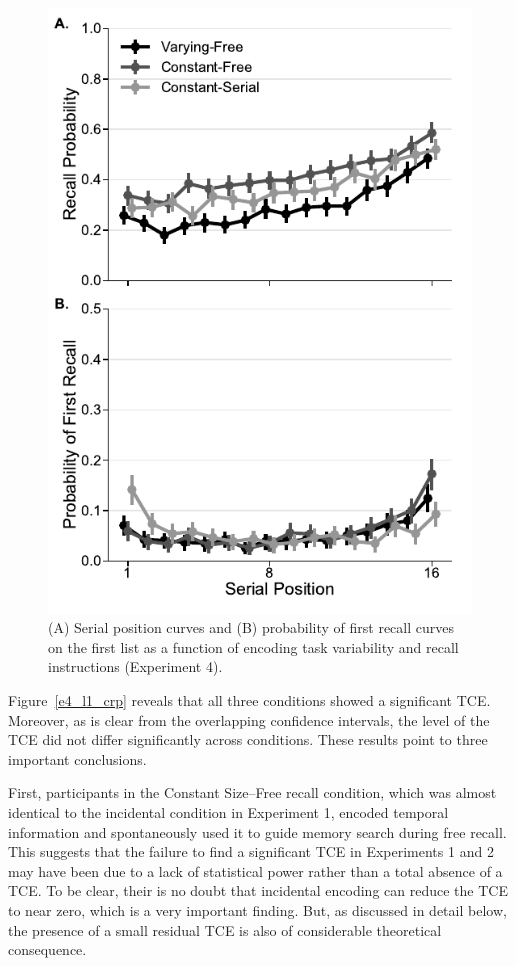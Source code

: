 \documentclass[man,natbib,floatsintext]{apa6} %
\begin{document}
\begin{figure}
\includegraphics{figures/E4_spc_list1.pdf}
\caption{(A) Serial position curves and (B) probability of first recall curves on the first list as a function of encoding task variability and recall instructions (Experiment 4).\spcpaneltext}
\label{e4_l1_spc}
\end{figure}

Figure~\ref{e4_l1_crp} reveals that all three conditions showed a significant TCE. Moreover, as is clear from the overlapping confidence intervals, the level of the TCE did not differ significantly across conditions. These results point to three important conclusions. 

First, participants in the Constant Size--Free recall condition, which was almost identical to the incidental condition in Experiment 1, encoded temporal information and spontaneously used it to guide memory search during free recall. This suggests that the failure to find a significant TCE in Experiments 1 and 2 may have been due to a lack of statistical power rather than a total absence of a TCE. To be clear, their is no doubt that incidental encoding can reduce the TCE to near zero, which is a very important finding. But, as discussed in detail below, the presence of a small residual TCE is also of considerable theoretical consequence.
\end{document}
